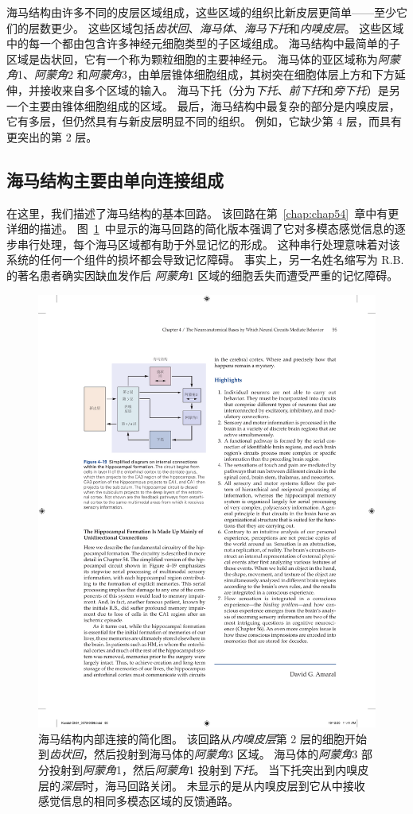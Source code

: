 海马结构由许多不同的皮层区域组成，这些区域的组织比新皮层更简单——至少它们的层数更少。
这些区域包括\textit{齿状回}、\textit{海马体}、\textit{海马下托}和\textit{内嗅皮层}。 
这些区域中的每一个都由包含许多神经元细胞类型的子区域组成。
海马结构中最简单的子区域是齿状回，它有一个称为颗粒细胞的主要神经元。
海马体的亚区域称为\textit{阿蒙角}1、\textit{阿蒙角}2 和\textit{阿蒙角}3，由单层锥体细胞组成，其树突在细胞体层上方和下方延伸，并接收来自多个区域的输入。
海马下托（分为\textit{下托}、\textit{前下托}和\textit{旁下托}）是另一个主要由锥体细胞组成的区域。
最后，海马结构中最复杂的部分是内嗅皮层，它有多层，但仍然具有与新皮层明显不同的组织。
例如，它缺少第 4 层，而具有更突出的第 2 层。



\subsection{海马结构主要由单向连接组成}

在这里，我们描述了海马结构的基本回路。
该回路在第~\ref{chap:chap54}~章中有更详细的描述。
图~\ref{fig:4_19}~中显示的海马回路的简化版本强调了它对多模态感觉信息的逐步串行处理，每个海马区域都有助于外显记忆的形成。
这种串行处理意味着对该系统的任何一个组件的损坏都会导致记忆障碍。
事实上，另一名姓名缩写为 R.B. 的著名患者确实因缺血发作后 \textit{阿蒙角}1 区域的细胞丢失而遭受严重的记忆障碍。


\begin{figure}[htbp]
	\centering
	\includegraphics[width=0.6\linewidth]{chap04/fig_4_19}
	\caption{海马结构内部连接的简化图。 
		该回路从\textit{内嗅皮层}第 2 层的细胞开始到\textit{齿状回}，然后投射到海马体的\textit{阿蒙角}3 区域。
		海马体的\textit{阿蒙角}3 部分投射到\textit{阿蒙角}1，然后\textit{阿蒙角}1 投射到\textit{下托}。
		当下托突出到内嗅皮层的\textit{深层}时，海马回路关闭。
		未显示的是从内嗅皮层到它从中接收感觉信息的相同多模态区域的反馈通路。}
	\label{fig:4_19}
\end{figure}


